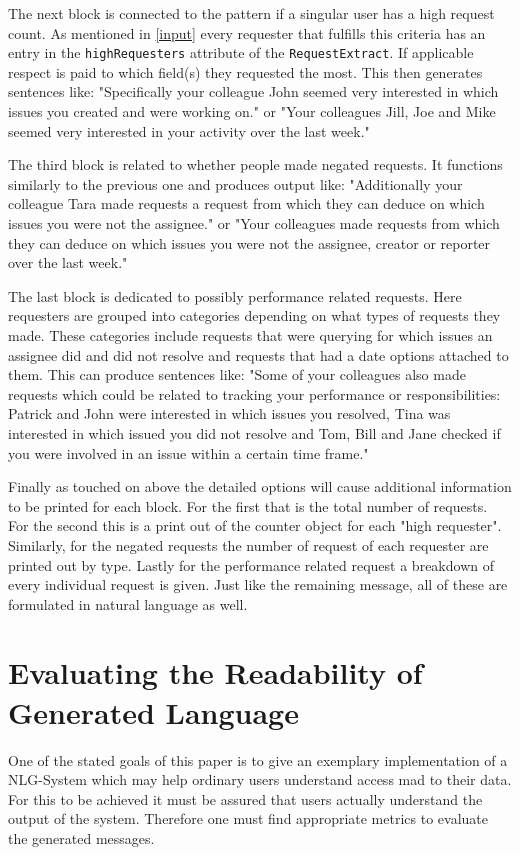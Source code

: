 \documentclass[sigconf,obeyspaces]{acmart}
\begin{document}
The next block is connected to the pattern if a singular user has a high request count. As mentioned in \ref{input} every requester that fulfills this criteria has an entry in the \texttt{highRequesters} attribute of the \texttt{RequestExtract}. If applicable respect is paid to which field(s) they requested the most. This then generates sentences like: "Specifically your colleague John seemed very interested in which issues you created and were working on." or "Your colleagues Jill, Joe and Mike seemed very interested in your activity over the last week."

The third block is related to whether people made negated requests. It functions similarly to the previous one and produces output like: "Additionally your colleague Tara made requests a request from which they can deduce on which issues you were not the assignee." or "Your colleagues made requests from which they can deduce on which issues you were not the assignee, creator or reporter over the last week."

The last block is dedicated to possibly performance related requests. Here requesters are grouped into categories depending on what types of requests they made. These categories include requests that were querying for which issues an assignee did and did not resolve and requests that had a date options attached to them. This can produce sentences like: "Some of your colleagues also made requests which could be related to tracking your performance or responsibilities:
Patrick and John were interested in which issues you resolved, Tina was interested in which issued you did not resolve and Tom, Bill and Jane checked if you were involved in an issue within a certain time frame."

Finally as touched on above the detailed options will cause additional information to be printed for each block. For the first that is the total number of requests. For the second this is a print out of the counter object for each "high requester". Similarly, for the negated requests the number of request of each requester are printed out by type. Lastly for the performance related request a breakdown of every individual request is given. Just like the remaining message, all of these are formulated in natural language as well.

\section{Evaluating the Readability of Generated Language}
One of the stated goals of this paper is to give an exemplary implementation of a NLG-System which may help ordinary users understand access mad to their data. For this to be achieved it must be assured that users actually understand the output of the system. Therefore one must find appropriate metrics to evaluate the generated messages.
\end{document}

